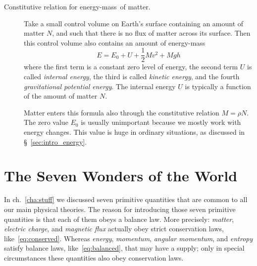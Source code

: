 \documentclass[a4paper,12pt,%
onecolumn,oneside,titlepage,%
british%
]{memoir}
\renewcommand*{\|}[1][]{\nonscript\:#1\vert\nonscript\:\mathopen{}}
\newcommand*{\sect}{\S}%
\newcommand*{\chap}{ch.}%
\newcommand*{\yN}{N}
\newcommand*{\yrho}{\rho}
\newcommand*{\yM}{M}%
\newcommand*{\yE}{E}
\newcommand*{\yU}{U}
\newcommand*{\energym}{energy-mass}
\begin{document}
\begin{description}
\item[Constitutive relation for \energym\ of matter.]
  Take a small control volume on Earth's surface containing an amount of matter $\yN$, and such that there is no flux of matter across its surface. Then this control volume also contains an amount of \energym
  \begin{equation*}
    \yE = \yE_{0} + \yU + \frac12 \yM v^{2} + \yM g h
  \end{equation*}
  where the first term is a constant zero level of energy, the second term $\yU$ is called \emph{internal energy}, the third is called \emph{kinetic energy}, and the fourth \emph{gravitational potential energy}. The internal energy $\yU$ is typically a function of the amount of matter $\yN$.

  Matter enters this formula also through the constitutive relation $\yM=\yrho\yN$. The zero value $\yE_{0}$ is usually unimportant because we mostly work with energy changes. This value is huge in ordinary situations, as discussed in \sect~\ref{sec:intro_energy}.

\end{description}


\section{The Seven Wonders of the World}
\label{sec:seven_wonders}

In \chap~\ref{cha:stuff} we discussed seven primitive quantities that are common to all our main physical theories. %
The reason for introducing those seven primitive quantities is that each of them obeys a balance law. More precisely: \emph{matter}, \emph{electric charge}, and \emph{magnetic flux} actually obey strict conservation laws, like~\eqref{eq:conserved}. Whereas \emph{energy}, \emph{momentum}, \emph{angular momentum}, and \emph{entropy} satisfy balance laws, like~\eqref{eq:balanced}, that may have a supply; only in special circumstances these quantities also obey conservation laws.
\end{document}
